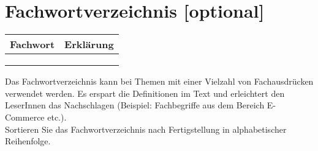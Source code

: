 \chapter{Fachwortverzeichnis [optional]}
\label{sec: Fachwort}

\begin{table}[h]
	\centering
	\begin{tabular}{|p{3cm}|p{11.6cm}|}
		\hline
		\rowcolor{lightgray}\textbf{Fachwort} & \textbf{Erklärung} \\
		\hline
		 & \\ 
		\hline
		 & \\ 
		\hline
		 & \\ 
		\hline
	\end{tabular}
\end{table}

\noindent Das Fachwortverzeichnis kann bei Themen mit einer Vielzahl von Fachausdrücken verwendet werden. Es erspart die Definitionen im Text und erleichtert den LeserInnen das Nachschlagen (Beispiel: Fachbegriffe aus dem Bereich E-Commerce etc.).\\
Sortieren Sie das Fachwortverzeichnis nach Fertigstellung in alphabetischer Reihenfolge.
